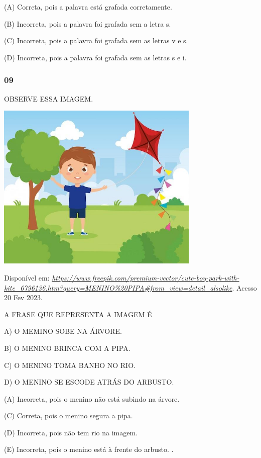 (A) Correta, pois a palavra está grafada corretamente.

(B) Incorreta, pois a palavra foi grafada sem a letra s.

(C) Incorreta, pois a palavra foi grafada sem as letras v e s.

(D) Incorreta, pois a palavra foi grafada sem as letras s e i.

\subsubsection{09 }\label{section-65}

OBSERVE ESSA IMAGEM.

\includegraphics[width=3.84043in,height=3.16853in]{media/image233.jpg}

Disponível em:
\href{https://www.freepik.com/premium-vector/cute-boy-park-with-kite_6796136.htm?query=MENINO\%20PIPA\#from_view=detail_alsolike}{\emph{https://www.freepik.com/premium-vector/cute-boy-park-with-kite\_6796136.htm?query=MENINO\%20PIPA\#from\_view=detail\_alsolike}}.
Acesso 20 Fev 2023.

A FRASE QUE REPRESENTA A IMAGEM É

A) O MEMINO SOBE NA ÁRVORE.

B) O MENINO BRINCA COM A PIPA.

C) O MENINO TOMA BANHO NO RIO.

D) O MENINO SE ESCODE ATRÁS DO ARBUSTO.

(A) Incorreta, pois o menino não está subindo na árvore. 

(C) Correta, pois o menino segura a pipa.  

(D) Incorreta, pois não tem rio na imagem.  

(E) Incorreta, pois o menino está à frente do arbusto. . 

